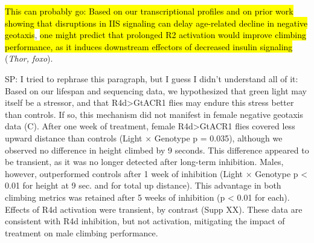 

\hl{This can probably go: Based on our transcriptional profiles and on prior work showing that disruptions in IIS signaling can delay age-related decline in negative geotaxis}\cite{jones2009}, \hl{one might predict that prolonged R2 activation would improve climbing performance, as it induces downstream effectors of decreased insulin signaling} (\textit{Thor, foxo}).


SP: I tried to rephrase this paragraph, but I guess I didn't understand all of it:
Based on our lifespan and sequencing data, we hypothesized that green light may itself be a stressor, and that R4d>GtACR1 flies may endure this stress better than controls. If so, this mechanism did not manifest in female negative geotaxis data (C). After one week of treatment, female R4d>GtACR1 flies covered less upward distance than controls (Light $\times$ Genotype p = 0.035), although we observed no difference in height climbed by 9 seconds. 
This difference appeared to be transient, as it was no longer detected after long-term inhibition. Males, however, outperformed controls after 1 week of inhibition (Light $\times$ Genotype p < 0.01 for height at 9 sec. and for total up distance). This advantage in both climbing metrics was retained after 5 weeks of inhibition (p < 0.01 for each). Effects of R4d activation were transient, by contrast (Supp XX). These data are consistent with R4d inhibition, but not activation, mitigating the impact of treatment on male climbing performance.